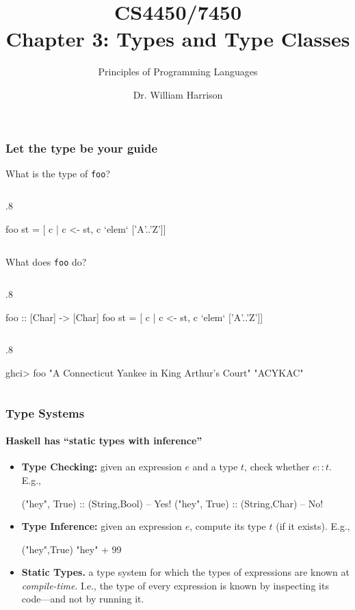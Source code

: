 \documentclass{beamer}
\title[CS4450]{CS4450/7450\\Chapter 3: Types and Type Classes}
\subtitle{Principles of Programming Languages}
\author[Bill Harrison]{Dr. William Harrison}
\institute{University of Missouri}
\newenvironment{codeblock}[1][.8]{%
\begin{columns}
\begin{column}{#1\linewidth}
\begin{exampleblock}{}}{%
\end{exampleblock}
\end{column}
\end{columns}}
\begin{document}
\frame{\titlepage}

\begin{frame}[fragile]
\frametitle{Let the type be your guide}

What is the type of \verb+foo+?
\begin{codeblock}
\begin{hcode}
foo st = [ c | c <- st, c `elem` ['A'..'Z']] 
\end{hcode}
\end{codeblock}

\vfill
\pause
What does \verb+foo+ do?
\begin{codeblock}
\begin{hcode}
foo :: [Char] -> [Char]  
foo st = [ c | c <- st, c `elem` ['A'..'Z']] 
\end{hcode}
\end{codeblock}

\pause
\begin{codeblock}
\begin{hcode}
ghci> foo "A Connecticut Yankee in King Arthur's Court"
"ACYKAC"
\end{hcode}
\end{codeblock}

\end{frame}


\begin{frame}[fragile]
\frametitle{Type Systems}
\framesubtitle{Haskell has ``static types with inference''}

\begin{itemize}
\item {\bf Type Checking:} given an expression $e$ and a type $t$, check whether $e :: t$. E.g., 
\begin{hcode}
("hey", True) :: (String,Bool) -- Yes!
("hey", True) :: (String,Char) -- No!
\end{hcode}

\pause
\item {\bf{Type Inference:}} given an expression $e$, compute its type $t$ (if it exists). E.g., 
\begin{hcode}
("hey",True)   %
"hey" + 99     %
\end{hcode}

\pause 
\item {\bf Static Types.} a type system for which the types of expressions are known at \emph{compile-time}. I.e., the type of every expression is known by inspecting its code---and not by running it.
\end{itemize}

\end{frame}
\end{document}
